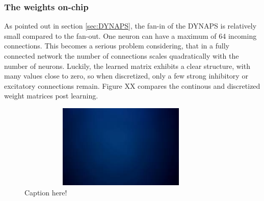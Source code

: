 \documentclass[twoside,11pt]{article}
\begin{document}
\newpage

\subsubsection{The weights on-chip}
As pointed out in section \ref{sec:DYNAPS}, the fan-in of the DYNAPS is relatively small
compared to the fan-out. One neuron can have a maximum of 64 incoming connections.
This becomes a serious problem considering, that in a fully connected network
the number of connections scales quadratically with the number of neurons.
Luckily, the learned matrix exhibits a clear structure, with many values close to zero, so when
discretized, only a few strong inhibitory or excitatory connections remain. Figure XX
compares the continous and discretized weight matrices post learning.

\begin{figure}[!htb]
  \centering
  \includegraphics[width =10cm, height=4cm]{figures/placeholder.jpeg}
  \caption{Caption here!}
  \label{fig:spiking_vs_continous}
\end{figure}
\end{document}

